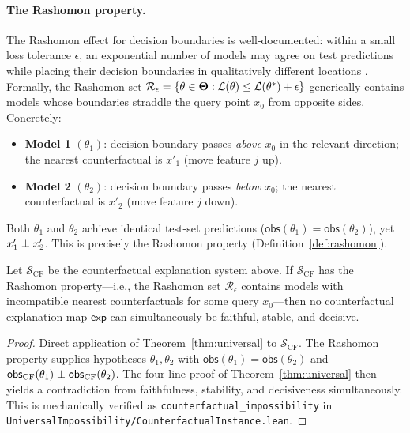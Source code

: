 \paragraph{The Rashomon property.}
The Rashomon effect for decision boundaries is well-documented: within a small
loss tolerance $\epsilon$, an exponential number of models may agree on test
predictions while placing their decision boundaries in qualitatively different
locations \citep{semenova2022existence, fisher2019models}.  Formally, the
Rashomon set
$\mathcal{R}_\epsilon = \{\theta \in \mathbf{\Theta} : \mathcal{L}(\theta) \leq
\mathcal{L}(\theta^*) + \epsilon\}$
generically contains models whose boundaries straddle the query point $x_0$
from opposite sides.  Concretely:
\begin{itemize}
  \item \textbf{Model 1} $(\theta_1)$: decision boundary passes \emph{above}
    $x_0$ in the relevant direction; the nearest counterfactual is $x'_1$
    (move feature $j$ up).
  \item \textbf{Model 2} $(\theta_2)$: decision boundary passes \emph{below}
    $x_0$; the nearest counterfactual is $x'_2$ (move feature $j$ down).
\end{itemize}
Both $\theta_1$ and $\theta_2$ achieve identical test-set predictions
($\mathsf{obs}(\theta_1) = \mathsf{obs}(\theta_2)$), yet $x'_1 \perp x'_2$.
This is precisely the Rashomon property (Definition~\ref{def:rashomon}).

\begin{proposition}
\label{prop:counterfactual-impossibility}
Let $\mathcal{S}_{\mathrm{CF}}$ be the counterfactual explanation system above.
If $\mathcal{S}_{\mathrm{CF}}$ has the Rashomon property---i.e., the Rashomon
set $\mathcal{R}_\epsilon$ contains models with incompatible nearest
counterfactuals for some query $x_0$---then no counterfactual explanation map
$\mathsf{exp}$ can simultaneously be faithful, stable, and decisive.
\end{proposition}

\begin{proof}
Direct application of Theorem~\ref{thm:universal} to
$\mathcal{S}_{\mathrm{CF}}$.  The Rashomon property supplies hypotheses
$\theta_1, \theta_2$ with $\mathsf{obs}(\theta_1) = \mathsf{obs}(\theta_2)$
and $\mathsf{obs}_{\mathrm{CF}}(\theta_1) \perp \mathsf{obs}_{\mathrm{CF}}(\theta_2)$.
The four-line proof of Theorem~\ref{thm:universal} then yields a contradiction
from faithfulness, stability, and decisiveness simultaneously.  This is
mechanically verified as \texttt{counterfactual\_impossibility} in
\texttt{UniversalImpossibility/CounterfactualInstance.lean}.
\end{proof}

